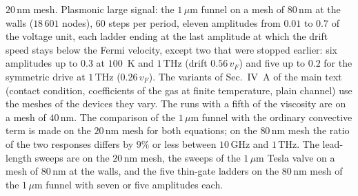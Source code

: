 \documentclass[aps,prapplied,onecolumn,superscriptaddress,floatfix]{revtex4-2}
\newcommand{\um}{\,\mu\mathrm{m}}
\newcommand{\nm}{\,\mathrm{nm}}
\newcommand{\THz}{\,\mathrm{THz}}
\newcommand{\GHz}{\,\mathrm{GHz}}
\begin{document}
$20\nm$ mesh. Plasmonic large signal:
the $1\um$ funnel on a mesh of $80\nm$ at the walls ($18\,601$ nodes), 60 steps per period, eleven amplitudes from $0.01$ to
$0.7$ of the voltage unit, each ladder ending at the last amplitude at
which the drift speed stays below the Fermi velocity, except two that
were stopped earlier: six amplitudes up to $0.3$ at $100$~K and
$1\THz$ (drift $0.56\,v_{F}$) and five up to $0.2$ for the symmetric
drive at $1\THz$ ($0.26\,v_{F}$). The
variants of Sec.~IV~A of the main text (contact condition, coefficients of
the gas at finite temperature, plain channel) use the meshes of the
devices they vary. The runs with a fifth of the viscosity are on a mesh
of $40\nm$. The comparison of the $1\um$ funnel with the ordinary
convective term is made on the $20\nm$ mesh for both equations; on the
$80\nm$ mesh the ratio of the two responses differs by $9\%$ or less
between $10\GHz$ and $1\THz$. The lead-length sweeps are on the $20\nm$
mesh, the sweeps of the $1\um$ Tesla valve on a mesh of $80\nm$ at the
walls, and the five thin-gate ladders on the $80\nm$ mesh of the $1\um$
funnel with seven or five amplitudes each.


\end{document}
